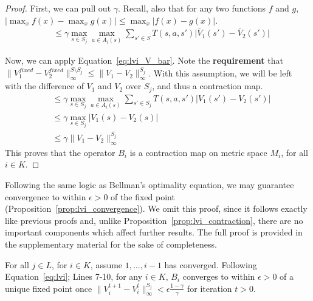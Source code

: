 \begin{proof}
First, we can pull out $\gamma$. Recall, also that for any two functions $f$ and $g$, $| \max_x f(x) - \max_x g(x) | \leq \max_x | f(x) - g(x) |$. %
\begin{align*}
    &\leq \gamma \max_{s \in S_j} \max_{a \in A_i(s)} \sum_{s' \in S} T(s, a, s') \Big| \bar{V}_1(s') - \bar{V}_2(s') \Big|
\end{align*}

Now, we can apply Equation~\ref{eq:lvi_V_bar}. Note the {\bf requirement} that $\| V_1^{fixed} - V_2^{fixed} \|_\infty^{S \setminus S_j} \leq \| V_1 - V_2 \|_\infty^{S_j}$. With this assumption, we will be left with the difference of $V_1$ and $V_2$ over $S_j$, and thus a contraction map.
\begin{align*}
    &\leq \gamma \max_{s \in S_j} \max_{a \in A_i(s)} \sum_{s' \in S_j} T(s, a, s') \Big| V_1(s') - V_2(s') \Big| \\
    &\leq \gamma \max_{s \in S_j} \Big| V_1(s) - V_2(s) \Big| \\
    &\leq \gamma \| V_1 - V_2 \|_\infty^{S_j}
\end{align*}
This proves that the operator $B_i$ is a contraction map on metric space $M_i$, for all $i \in K$.
\end{proof}


Following the same logic as Bellman's optimality equation, we may guarantee convergence to within $\epsilon > 0$ of the fixed point (Proposition~\ref{prop:lvi_convergence}). We omit this proof, since it follows exactly like previous proofs and, unlike Proposition~\ref{prop:lvi_contraction}, there are no important components which affect further results. The full proof is provided in the supplementary material for the sake of completeness.


\begin{proposition}
    \label{prop:lvi_convergence}
    For all $j \in L$, for $i \in K$, assume $1, \ldots, i - 1$ has converged. Following Equation~\ref{eq:lvi}; Lines 7-10, for any $i \in K$, $B_i$ converges to within $\epsilon > 0$ of a unique fixed point once $\| V_i^{t+1} - V_i^t \|_\infty^{S_j} < \epsilon \frac{1 - \gamma}{\gamma}$ for iteration $t > 0$.
\end{proposition}


